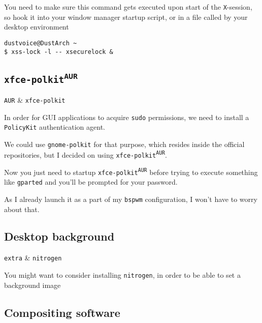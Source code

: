 \documentclass[10pt]{dustdoc}
\begin{document}
\begin{IMPORTANT}
    You need to make sure this command gets executed upon start of the \texttt{X}-session, so hook it into your window manager startup script, or in a file called by your desktop environment

    \begin{verbatim}
dustvoice@DustArch ~
$ xss-lock -l -- xsecurelock &
    \end{verbatim}
\end{IMPORTANT}

\subsection{\texttt{xfce-polkit\texorpdfstring{\textsuperscript{AUR}}{ (AUR)}}}
\label{sec:xfce-polkit-aur}

\begin{packagetable}
    \texttt{AUR} & \texttt{xfce-polkit} \\
\end{packagetable}

In order for GUI applications to acquire \texttt{sudo} permissions, we need to install a \texttt{PolicyKit} authentication agent.

We could use \texttt{gnome-polkit} for that purpose, which resides inside the official repositories, but I decided on using \texttt{xfce-polkit\textsuperscript{\texttt{AUR}}}.

Now you just need to startup \texttt{xfce-polkit\textsuperscript{\texttt{AUR}}} before trying to execute something like \texttt{gparted} and you’ll be prompted for your password.

As I already launch it as a part of my \texttt{bspwm} configuration, I won’t have to worry about that.

\subsection{Desktop background}
\label{sec:desktop-background}

\begin{packagetable}
    \texttt{extra} & \texttt{nitrogen} \\
\end{packagetable}

You might want to consider installing \texttt{nitrogen}, in order to be able to set a background image

\subsection{Compositing software}
\label{sec:compositing-software}
\end{document}
